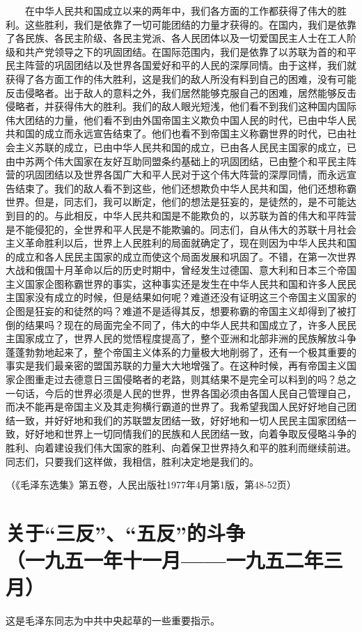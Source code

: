 \documentclass[cn,11pt,chinese]{elegantbook}
\def\myformat#1{\hfil\hfil #1}
\begin{document}
　　在中华人民共和国成立以来的两年中，我们各方面的工作都获得了伟大的胜利。这些胜利，我们是依靠了一切可能团结的力量才获得的。在国内，我们是依靠了各民族、各民主阶级、各民主党派、各人民团体以及一切爱国民主人士在工人阶级和共产党领导之下的巩固团结。在国际范围内，我们是依靠了以苏联为首的和平民主阵营的巩固团结以及世界各国爱好和平的人民的深厚同情。由于这样，我们就获得了各方面工作的伟大胜利，这是我们的敌人所没有料到自己的困难，没有可能反击侵略者。出于敌人的意料之外，我们居然能够克服自己的困难，居然能够反击侵略者，并获得伟大的胜利。我们的敌人眼光短浅，他们看不到我们这种国内国际伟大团结的力量，他们看不到由外国帝国主义欺负中国人民的时代，已由中华人民共和国的成立而永远宣告结束了。他们也看不到帝国主义称霸世界的时代，已由社会主义苏联的成立，已由中华人民共和国的成立，已由各人民民主国家的成立，已由中苏两个伟大国家在友好互助同盟条约基础上的巩固团结，已由整个和平民主阵营的巩固团结以及世界各国广大和平人民对于这个伟大阵营的深厚同情，而永远宣告结束了。我们的敌人看不到这些，他们还想欺负中华人民共和国，他们还想称霸世界。但是，同志们，我可以断定，他们的想法是狂妄的，是徒然的，是不可能达到目的的。与此相反，中华人民共和国是不能欺负的，以苏联为首的伟大和平阵营是不能侵犯的，全世界和平人民是不能欺骗的。同志们，自从伟大的苏联十月社会主义革命胜利以后，世界上人民胜利的局面就确定了，现在则因为中华人民共和国的成立和各人民民主国家的成立而使这个局面发展和巩固了。不错，在第一次世界大战和俄国十月革命以后的历史时期中，曾经发生过德国、意大利和日本三个帝国主义国家企图称霸世界的事实，这种事实还是发生在中华人民共和国和许多人民民主国家没有成立的时候，但是结果如何呢？难道还没有证明这三个帝国主义国家的企图是狂妄的和徒然的吗？难道不是适得其反，想要称霸的帝国主义却得到了被打倒的结果吗？现在的局面完全不同了，伟大的中华人民共和国成立了，许多人民民主国家成立了，世界人民的觉悟程度提高了，整个亚洲和北部非洲的民族解放斗争蓬蓬勃勃地起来了，整个帝国主义体系的力量极大地削弱了，还有一个极其重要的事实是我们最亲密的盟国苏联的力量大大地增强了。在这种时候，再有帝国主义国家企图重走过去德意日三国侵略者的老路，则其结果不是完全可以料到的吗？总之一句话，今后的世界必须是人民的世界，世界各国必须由各国人民自己管理自己，而决不能再是帝国主义及其走狗横行霸道的世界了。我希望我国人民好好地自己团结一致，并好好地和我们的苏联盟友团结一致，好好地和一切人民民主国家团结一致，好好地和世界上一切同情我们的民族和人民团结一致，向着争取反侵略斗争的胜利、向着建设我们伟大国家的胜利、向着保卫世界持久和平的胜利而继续前进。同志们，只要我们这样做，我相信，胜利决定地是我们的。\\
\begin{flushright}（《毛泽东选集》第五卷，人民出版社1977年4月第1版，第48-52页）\end{flushright}
\newpage\section*{\myformat{关于“三反”、“五反”的斗争}\\\myformat{（一九五一年十一月——一九五二年三月）}}
\begin{introduction}\item  这是毛泽东同志为中共中央起草的一些重要指示。\end{introduction}
\end{document}
